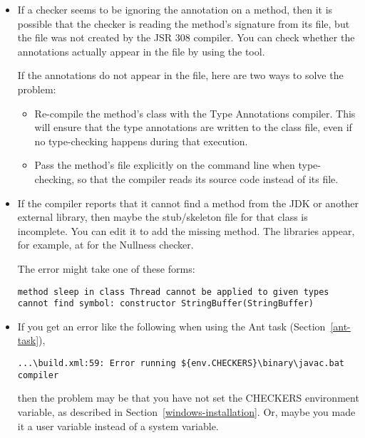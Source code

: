 \begin{itemize}
\item
If a checker seems to be ignoring the annotation on a method, then it is
possible that the checker is reading the method's signature from its
 file, but the  file was not created by the JSR
308 compiler.  You can check whether the annotations actually appear in the
 file by using the  tool.

If the annotations do not appear in the  file, here are two
ways to solve the problem:
\begin{itemize}
\item
  Re-compile the method's class with the Type Annotations compiler.  This will
  ensure that the type annotations are written to the class file, even if
  no type-checking happens during that execution.
\item
  Pass the method's file explicitly on the command line when type-checking,
  so that the compiler reads its source code instead of its 
  file.
\end{itemize}

\item
If the compiler reports that it cannot find a method from the
JDK or another external library, then maybe the stub/skeleton file for that
class is incomplete.  You can edit it to add the missing method.  The
libraries appear, for example, at  for the
Nullness checker.

The error might take one of these forms:

\begin{Verbatim}
method sleep in class Thread cannot be applied to given types
cannot find symbol: constructor StringBuffer(StringBuffer)
\end{Verbatim}

\item
If you get an error like the following when using the Ant task
(Section~\ref{ant-task}),

\begin{smaller}
\begin{Verbatim}
...\build.xml:59: Error running ${env.CHECKERS}\binary\javac.bat compiler
\end{Verbatim}
\end{smaller}

\noindent
then the problem may be that you have not set the CHECKERS environment
variable, as described in Section~\ref{windows-installation}.  Or, maybe
you made it a user variable instead of a system variable.


\end{itemize}
